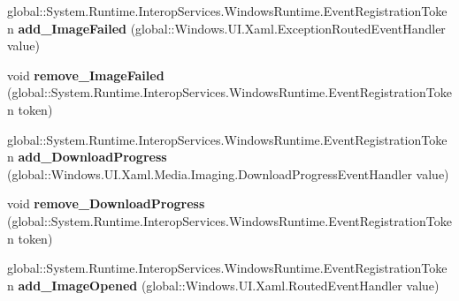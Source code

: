 \begin{DoxyCompactItemize}
\item 
\mbox{\label{interface_windows_1_1_u_i_1_1_xaml_1_1_media_1_1_imaging_1_1_i_bitmap_image_a6aa4435d5ae45040075c92c78e19dabb}} 
global\+::\+System.\+Runtime.\+Interop\+Services.\+Windows\+Runtime.\+Event\+Registration\+Token {\bfseries add\+\_\+\+Image\+Failed} (global\+::\+Windows.\+U\+I.\+Xaml.\+Exception\+Routed\+Event\+Handler value)
\item 
\mbox{\label{interface_windows_1_1_u_i_1_1_xaml_1_1_media_1_1_imaging_1_1_i_bitmap_image_ab77fcc8961126a071f77bee1dc55bcc6}} 
void {\bfseries remove\+\_\+\+Image\+Failed} (global\+::\+System.\+Runtime.\+Interop\+Services.\+Windows\+Runtime.\+Event\+Registration\+Token token)
\item 
\mbox{\label{interface_windows_1_1_u_i_1_1_xaml_1_1_media_1_1_imaging_1_1_i_bitmap_image_a81353ece4edf0af8840923994b02b772}} 
global\+::\+System.\+Runtime.\+Interop\+Services.\+Windows\+Runtime.\+Event\+Registration\+Token {\bfseries add\+\_\+\+Download\+Progress} (global\+::\+Windows.\+U\+I.\+Xaml.\+Media.\+Imaging.\+Download\+Progress\+Event\+Handler value)
\item 
\mbox{\label{interface_windows_1_1_u_i_1_1_xaml_1_1_media_1_1_imaging_1_1_i_bitmap_image_ab600f3019a91621d8000a9cdc22141e7}} 
void {\bfseries remove\+\_\+\+Download\+Progress} (global\+::\+System.\+Runtime.\+Interop\+Services.\+Windows\+Runtime.\+Event\+Registration\+Token token)
\item 
\mbox{\label{interface_windows_1_1_u_i_1_1_xaml_1_1_media_1_1_imaging_1_1_i_bitmap_image_a0a0af7713d2dfccf2cd37b15f1f121ea}} 
global\+::\+System.\+Runtime.\+Interop\+Services.\+Windows\+Runtime.\+Event\+Registration\+Token {\bfseries add\+\_\+\+Image\+Opened} (global\+::\+Windows.\+U\+I.\+Xaml.\+Routed\+Event\+Handler value)
\item 
\mbox{\label{interface_windows_1_1_u_i_1_1_xaml_1_1_media_1_1_imaging_1_1_i_bitmap_image_ac903f9457bc42510bd952dcb07c5c1d1}} 

\end{DoxyCompactItemize}
